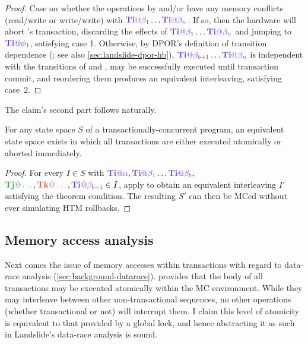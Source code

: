 \begin{proof}
	Case on whether the operations by \tjj and/or \tkk have any memory conflicts (read/\allowbreak{}write or write/write)
	with $\tiiat{\beta_1}\dots\tiiat{\beta_n}$.
	If so, then the hardware will abort \tii's transaction, discarding the effects of $\tiiat{\beta_1}\dots\tiiat{\beta_n}$
	and jumping to $\tiiat{\phi_1}$,
	satisfying case 1.
	Otherwise, by DPOR's definition of transition dependence (\cite{dpor}; see also \cref{sec:landslide-dpor-hb}),
	$\tiiat{\beta_{b+1}}\dots\tiiat{\beta_n}$ is independent with the transitions of \tjj and \tkk,
	may be successfully executed until transaction commit,
	and reordering them produces an equivalent interleaving,
	satisfying case~2.
\end{proof}

The claim's second part follows naturally.
\vspace{1em}

\begin{theorem}
	\label{thm:atom}
	For any state space $S$ of a transactionally-concurrent program,
	an equivalent state space exists in which all transactions are either executed atomically or aborted immediately.
\end{theorem}

\begin{proof}
	For every $I \in S$ with $\tiiat{\alpha},\tiiat{\beta_1}\dots\tiiat{\beta_b},$ $\tjjat{\dots},\tkkat{\dots},\tiiat{\beta_{b+1}} \in I$,
	apply  to obtain an equivalent interleaving $I'$ satisfying the theorem condition.
	The resulting $S'$ can then be MCed without ever simulating HTM rollbacks.
\end{proof}

\subsection{Memory access analysis}
\label{sec:tm-design-locks}

Next comes the issue of memory accesses within transactions with regard to data-race analysis (\cref{sec:background-datarace}).
 provides that the body of all transactions may be executed atomically within the MC environment.
While they may interleave between other non-transactional sequences,
no other operations (whether transactional or not) will interrupt them.
I claim this level of atomicity is equivalent to that provided by a global lock,
and hence abstracting it as such in Landslide's data-race analysis is sound.

